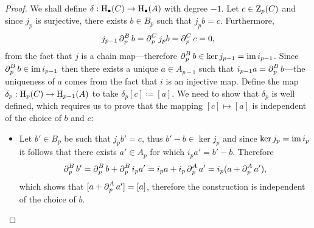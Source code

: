 \begin{proof}
We shall define \(\delta: \operatorname{H}_\bullet(C) \to \operatorname{H}_{\bullet}(A)\) with degree
\(-1\). Let \(c \in \operatorname{Z}_p(C)\) and since \(j_p\) is surjective, there exists
\(b \in B_p\) such that \(j_p b = c\). Furthermore,
\[
j_{p-1} \operatorname{\partial}_p^B b = \operatorname{\partial}_p^C j_p b = \operatorname{\partial}_p^C c = 0,
\]
from the fact that \(j\) is a chain map---therefore
\(\operatorname{\partial}_p^B b \in \ker j_{p-1} = \operatorname{im} i_{p-1}\). Since
\(\operatorname{\partial}_p^B b \in \operatorname{im} i_{p-1}\) then there exists a unique \(a \in A_{p-1}\) such
that \(i_{p-1} a = \operatorname{\partial}_p^B b\)---the uniqueness of \(a\) comes from the fact
that \(i\) is an injective map. Define the map
\(\delta_p: \operatorname{H}_p(C) \to \operatorname{H}_{p-1}(A)\) to take
\(\delta_p[c] \coloneq [a]\). We need to show that \(\delta_p\) is well defined, which requires
us to prove that the mapping \([c] \mapsto [a]\) is independent of the choice of
\(b\) and \(c\):
\begin{itemize}\setlength\itemsep{0em}
\item Let \(b' \in B_p\) be such that \(j_p b' = c\), thus \(b' - b \in \ker j_p\)
  and since \(\ker j_p = \operatorname{im} i_p\) it follows that there exists \(a' \in A_p\) for
  which \(i_p a' = b' - b\). Therefore
  \[
  \operatorname{\partial}_p^B b'
  = \operatorname{\partial}_p^B b + \operatorname{\partial}_p^B i_p a'
  = i_p a + i_p \operatorname{\partial}_p^A a'
  = i_p(a + \operatorname{\partial}_p^A a'),
  \]
  which shows that \([a + \operatorname{\partial}_p^A a'] = [a]\), therefore the construction is
  independent of the choice of \(b\).


\end{itemize}
\end{proof}
